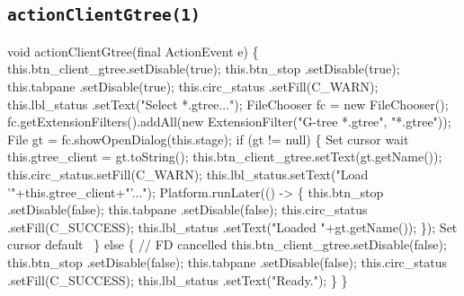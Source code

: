 \subsection{\texttt{actionClientGtree(1)}}
\nwenddocs{}\endmoddef{}
void actionClientGtree(final ActionEvent e) \{
  this.btn_client_gtree.setDisable(true);
  this.btn_stop     .setDisable(true);
  this.tabpane      .setDisable(true);
  this.circ_status  .setFill(C_WARN);
  this.lbl_status   .setText("Select *.gtree...");
  FileChooser fc = new FileChooser();
  fc.getExtensionFilters().addAll(new ExtensionFilter("G-tree *.gtree", "*.gtree"));
  File gt = fc.showOpenDialog(this.stage);
  if (gt != null) \{
    \LA{}Set cursor wait~{\nwtagstyle{}}\RA{}
    this.gtree_client = gt.toString();
    this.btn_client_gtree.setText(gt.getName());
    this.circ_status.setFill(C_WARN);
    this.lbl_status.setText("Load '"+this.gtree_client+"'...");
    Platform.runLater(() -> \{
      this.btn_stop     .setDisable(false);
      this.tabpane      .setDisable(false);
      this.circ_status  .setFill(C_SUCCESS);
      this.lbl_status   .setText("Loaded "+gt.getName());
    \});
    \LA{}Set cursor default~{\nwtagstyle{}}\RA{}
  \} else \{
    // FD cancelled
    this.btn_client_gtree.setDisable(false);
    this.btn_stop     .setDisable(false);
    this.tabpane      .setDisable(false);
    this.circ_status  .setFill(C_SUCCESS);
    this.lbl_status   .setText("Ready.");
  \}
\}
\eatline
{}\nwendcode{}\nwdocspar
